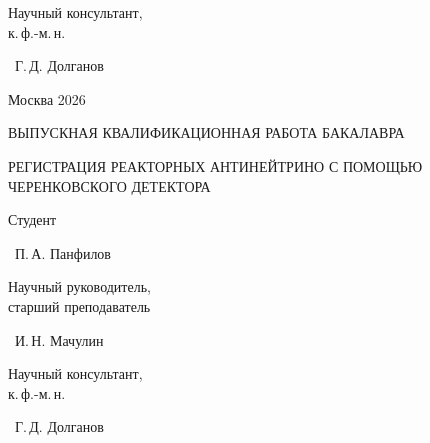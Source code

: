 \documentclass[a4paper,12pt]{extarticle}
\begin{document}
\begin{titlepage}
\begin{center}
    \begin{minipage}[b][2\baselineskip][b]{0.4\textwidth}
    Научный консультант,\\
    к.\,ф.-м.\,н.
    \end{minipage}
    \hspace{1cm}
    \begin{minipage}[b][2\baselineskip][b]{0.5\textwidth}
    \underline{\hspace{2cm}}~Г.\,Д. Долганов
    \end{minipage}

    \vfill
    Москва 2026
\end{center}
\end{titlepage}

\thispagestyle{empty}

\begin{center}

\MakeTextUppercase{Выпускная квалификационная работа бакалавра}

\vspace{\baselineskip}

\begin{bfseries}
\MakeTextUppercase{Регистрация реакторных антинейтрино с помощью черенковского детектора}
\end{bfseries}

\vspace{2\baselineskip}

\begin{minipage}[b][\baselineskip][b]{0.4\textwidth}
Студент
\end{minipage}
\hspace{1cm}
\begin{minipage}[b][\baselineskip][b]{0.5\textwidth}
\underline{\hspace{2cm}}~П.\,А. Панфилов
\end{minipage}

\begin{minipage}[b][2\baselineskip][b]{0.4\textwidth}
Научный руководитель,\\
старший преподаватель
\end{minipage}
\hspace{1cm}
\begin{minipage}[b][2\baselineskip][b]{0.5\textwidth}
\underline{\hspace{2cm}}~И.\,Н. Мачулин
\end{minipage}

\begin{minipage}[b][2\baselineskip][b]{0.4\textwidth}
Научный консультант,\\
к.\,ф.-м.\,н.
\end{minipage}
\hspace{1cm}
\begin{minipage}[b][2\baselineskip][b]{0.5\textwidth}
\underline{\hspace{2cm}}~Г.\,Д. Долганов
\end{minipage}


\end{center}
\end{document}
